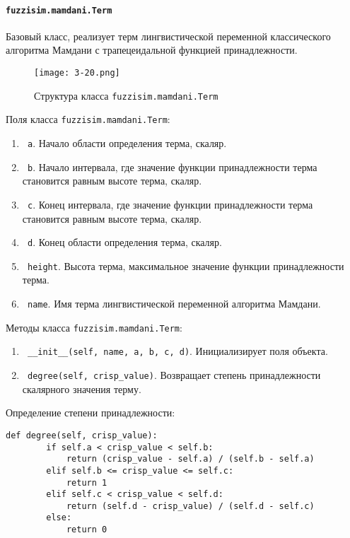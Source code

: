 \paragraph{\lstinline!fuzzisim.mamdani.Term!}

Базовый класс, реализует терм лингвистической переменной классического алгоритма Мамдани с трапецеидальной функцией принадлежности.

\begin{figure}[ht]
	\centering
	\texttt{[image: 3-20.png]}
	\caption{ Структура класса \lstinline!fuzzisim.mamdani.Term!}
\end{figure}

Поля класса \lstinline!fuzzisim.mamdani.Term!:
\begin{enumerate}[label=\arabic*)]
	\item \lstinline! a!. Начало области определения терма, скаляр.
	\item \lstinline! b!. Начало интервала, где значение функции принадлежности терма становится равным высоте терма, скаляр.
	\item \lstinline! c!. Конец интервала, где значение функции принадлежности терма становится равным высоте терма, скаляр.
	\item \lstinline! d!.   Конец области определения терма, скаляр.
	\item \lstinline! height!. Высота терма, максимальное значение функции принадлежности терма.
	\item \lstinline! name!. Имя терма лингвистической переменной алгоритма Мамдани.
\end{enumerate}


Методы класса \lstinline!fuzzisim.mamdani.Term!:
\begin{enumerate}[label=\arabic*)]
	\item \lstinline! __init__(self, name, a, b, c, d)!. Инициализирует поля объекта.
	\item \lstinline! degree(self, crisp_value)!. Возвращает степень принадлежности скалярного значения терму.
\end{enumerate}

Определение степени принадлежности:
\begin{lstlisting}[style=pythonstyle,caption={  }, label=lst:func:1]
	def degree(self, crisp_value):
		if self.a < crisp_value < self.b:
			return (crisp_value - self.a) / (self.b - self.a)
		elif self.b <= crisp_value <= self.c:
			return 1
		elif self.c < crisp_value < self.d:
			return (self.d - crisp_value) / (self.d - self.c)
		else:
			return 0
\end{lstlisting}



